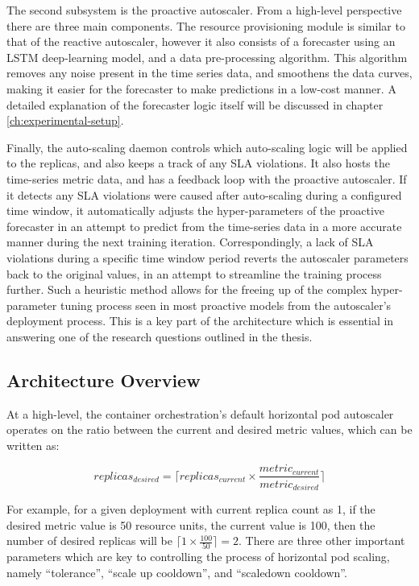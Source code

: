 The second subsystem is the proactive autoscaler. From a high-level perspective there are three main components. The resource provisioning module is similar to that of the reactive autoscaler, however it also consists of a forecaster using an LSTM deep-learning model, and a data pre-processing algorithm. This algorithm removes any noise present in the time series data, and smoothens the data curves, making it easier for the forecaster to make predictions in a low-cost manner. A detailed explanation of the forecaster logic itself will be discussed in chapter \ref{ch:experimental-setup}.\par

Finally, the auto-scaling daemon controls which auto-scaling logic will be applied to the replicas, and also keeps a track of any SLA violations. It also hosts the time-series metric data, and has a feedback loop with the proactive autoscaler. If it detects any SLA violations were caused after auto-scaling during a configured time window, it automatically adjusts the hyper-parameters of the proactive forecaster in an attempt to predict from the time-series data in a more accurate manner during the next training iteration. Correspondingly, a lack of SLA violations during a specific time window period reverts the autoscaler parameters back to the original values, in an attempt to streamline the training process further. Such a heuristic method allows for the freeing up of the complex hyper-parameter tuning process seen in most proactive models from the autoscaler's deployment process. This is a key part of the architecture which is essential in answering one of the research questions outlined in the thesis.\par


\subsection{Architecture Overview}
\label{subsec:ch3-hybrid-arch}

At a high-level, the container orchestration's default horizontal pod autoscaler operates on the ratio between the current and desired metric values, which can be written as:

\begin{equation}
    replicas_{desired} = \lceil replicas_{current} \times \frac{metric_{current}}{metric_{desired}}\rceil
\end{equation}

For example, for a given deployment with current replica count as 1, if the desired metric value is 50 resource units, the current value is 100, then the number of desired replicas will be $\lceil 1 \times \frac{100}{50}\rceil = 2$. There are three other important parameters which are key to controlling the process of horizontal pod scaling, namely ``tolerance'', ``scale up cooldown'', and ``scaledown cooldown''.\par

